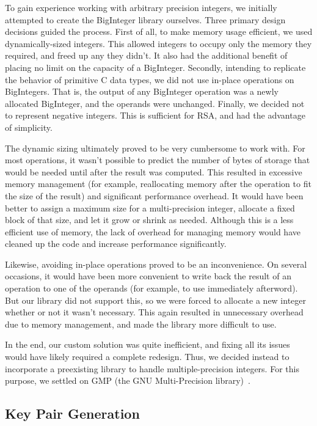\documentclass[letterpaper]{article}
\begin{document}
To gain experience working with arbitrary precision integers, we initially attempted to create the BigInteger library ourselves. Three primary design decisions guided the process. First of all, to make memory usage efficient, we used dynamically-sized integers. This allowed integers to occupy only the memory they required, and freed up any they didn't. It also had the additional benefit of placing no limit on the capacity of a BigInteger. Secondly, intending to replicate the behavior of primitive C data types, we did not use in-place operations on BigIntegers. That is, the output of any BigInteger operation was a newly allocated BigInteger, and the operands were unchanged. Finally, we decided not to represent negative integers. This is sufficient for RSA, and had the advantage of simplicity.

The dynamic sizing ultimately proved to be very cumbersome to work with. For most operations, it wasn't possible to predict the number of bytes of storage that would be needed until after the result was computed. This resulted in excessive memory management (for example, reallocating memory after the operation to fit the size of the result) and significant performance overhead. It would have been better to assign a maximum size for a multi-precision integer, allocate a fixed block of that size, and let it grow or shrink as needed. Although this is a less efficient use of memory, the lack of overhead for managing memory would have cleaned up the code and increase performance significantly.

Likewise, avoiding in-place operations proved to be an inconvenience. On several occasions, it would have been more convenient to write back the result of an operation to one of the operands (for example, to use immediately afterword). But our library did not support this, so we were forced to allocate a new integer whether or not it wasn't necessary. This again resulted in unnecessary overhead due to memory management, and made the library more difficult to use.



In the end, our custom solution was quite inefficient, and fixing all its issues would have likely required a complete redesign. Thus, we decided instead to incorporate a preexisting library to handle multiple-precision integers. For this purpose, we settled on GMP (the GNU Multi-Precision library)~\cite{gmpmultiple}.

\subsection{Key Pair Generation}
\end{document}
